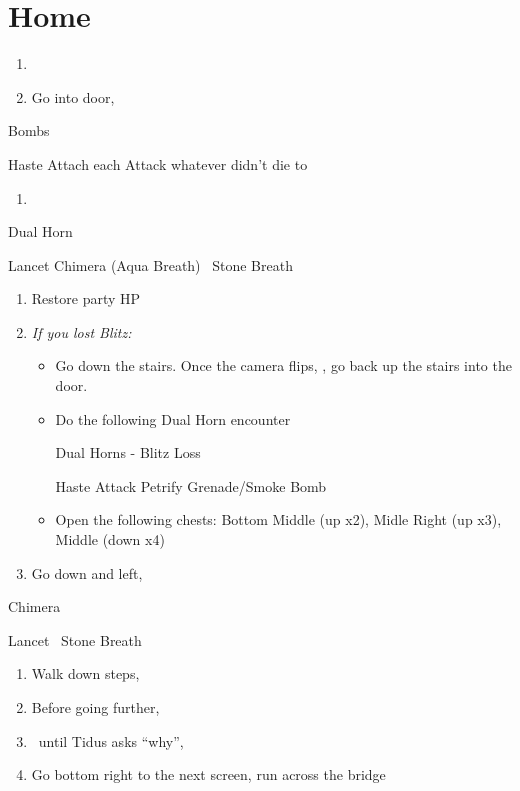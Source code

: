 \chapter{Home}

\begin{enumerate}
	\item \formation{\tidus}{\auron}{\lulu}
	\item Go into door, \sd
\end{enumerate}
\begin{battle}{Bombs}
\begin{itemize}
	\tidusf Haste \tidus
	\tidusf Attach each
	\auronf Attack whatever didn't die to \tidus
\end{itemize}
\end{battle}
\begin{enumerate}[resume]
	\item \sd
\end{enumerate}
\begin{battle}{Dual Horn}
\begin{itemize}
	\kimahrif Lancet Chimera (Aqua Breath)
	\kimahrif \od\ Stone Breath
\end{itemize}
\end{battle}
\begin{enumerate}[resume]
	\item Restore party HP
	\item \textit{If you lost Blitz:}
	\begin{itemize}
		\item Go down the stairs. Once the camera flips, \formation{\tidus}{\auron}{\rikku}, go back up the stairs into the door.
		\item Do the following Dual Horn encounter

		\begin{battle}{Dual Horns - Blitz Loss}
		\begin{itemize}
			\tidusf Haste \tidus
			\tidusf Attack
			\rikkuf Petrify Grenade/Smoke Bomb
		\end{itemize}
		\end{battle}
		\item Open the following chests: Bottom Middle (up x2), Midle Right (up x3), Middle (down x4) %
	\end{itemize}
	\item Go down and left, \cs[0:50]
\end{enumerate}
\begin{battle}{Chimera}
\begin{itemize}
	\switch{anyone}{\kimahri}
	\kimahrif Lancet
	\kimahrif \od\ Stone Breath
\end{itemize}
\end{battle}
\begin{enumerate}[resume]
	\item Walk down steps, \cs[1:30]
	\item Before going further, 
	\item \sd\ until Tidus asks ``why'', \cs[6:20]
	\item Go bottom right to the next screen, run across the bridge
\end{enumerate}
